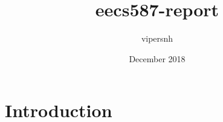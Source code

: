 \documentclass{article}
\title{eecs587-report}
\author{vipersnh }
\date{December 2018}
\begin{document}
\maketitle

\section{Introduction}
\end{document}
